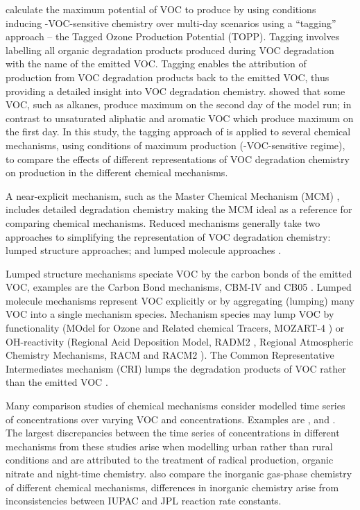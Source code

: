 \citet{Butler:2011} calculate the maximum potential of VOC to produce  by using  conditions inducing -VOC-sensitive chemistry over multi-day scenarios using a ``tagging'' approach -- the Tagged Ozone Production Potential (TOPP). 
Tagging involves labelling all organic degradation products produced during VOC degradation with the name of the emitted VOC.
Tagging enables the attribution of  production from VOC degradation products back to the emitted VOC, thus providing a detailed insight into VOC degradation chemistry.
\citet{Butler:2011} showed that some VOC, such as alkanes, produce maximum  on the second day of the model run; in contrast to unsaturated aliphatic and aromatic VOC which produce maximum  on the first day.
In this study, the tagging approach of \citet{Butler:2011} is applied to several chemical mechanisms, using conditions of maximum  production (-VOC-sensitive regime), to compare the effects of different representations of VOC degradation chemistry on  production in the different chemical mechanisms.

A near-explicit mechanism, such as the Master Chemical Mechanism (MCM) \citep{Jenkin:2003, Saunders:2003, Bloss:2005}, includes detailed degradation chemistry making the MCM ideal as a reference for comparing chemical mechanisms.
Reduced mechanisms generally take two approaches to simplifying the representation of VOC degradation chemistry: lumped structure approaches; and lumped molecule approaches \citep{Dodge:2000}. 

Lumped structure mechanisms speciate VOC by the carbon bonds of the emitted VOC, examples are the Carbon Bond mechanisms, CBM-IV \citep{Gery:1989} and CB05 \citep{Yarwood:2005}.
Lumped molecule mechanisms represent VOC explicitly or by aggregating (lumping) many VOC into a single mechanism species.
Mechanism species may lump VOC by functionality (MOdel for Ozone and Related chemical Tracers, MOZART-4 \citep{Emmons:2010}) or OH-reactivity (Regional Acid Deposition Model, RADM2 \citep{Stockwell:1990}, Regional Atmospheric Chemistry Mechanisms, RACM \citep{Stockwell:1997} and RACM2 \citep{Goliff:2013}).
The Common Representative Intermediates mechanism (CRI) lumps the degradation products of VOC rather than the emitted VOC \citep{Jenkin:2008}.

Many comparison studies of chemical mechanisms consider modelled time series of  concentrations over varying VOC and  concentrations.
Examples are \citet{Dunker:1984}, \citet{Kuhn:1998} and \citet{Emmerson:2009}.
The largest discrepancies between the time series of  concentrations in different mechanisms from these studies arise when modelling urban rather than rural conditions and are attributed to the treatment of radical production, organic nitrate and night-time chemistry.
\citet{Emmerson:2009} also compare the inorganic gas-phase chemistry of different chemical mechanisms, differences in inorganic chemistry arise from inconsistencies between IUPAC and JPL reaction rate constants.

